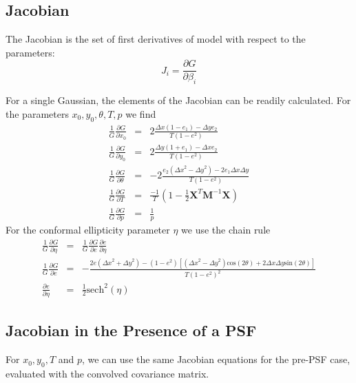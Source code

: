 \documentclass[12pt,preprint]{aastex}
\newcommand{\M}{\textbf{M}}
\newcommand{\X}{\textbf{X}}
\newcommand{\Dx}{\ensuremath{\Delta x}}
\newcommand{\Dy}{\ensuremath{\Delta y}}
\begin{document}
\subsection{Jacobian}

The Jacobian is the set of first derivatives of model with respect
to the parameters:
\begin{equation}
J_i = \frac{\partial G}{\partial \beta_i}
\end{equation}

For a single Gaussian, the elements of the Jacobian can be readily
calculated.  For the parameters $x_0,y_0,\theta,T,p$ we find
\begin{eqnarray}
\frac{1}{G} \frac{\partial G}{\partial x_0}
    & = & 2 \frac{ \Dx (1-e_1) - \Dy e_2 }{T (1-e^2)} \\
\frac{1}{G} \frac{\partial G}{\partial y_0}
    & = & 2 \frac{ \Dy (1+e_1) - \Dx e_2 }{T (1-e^2)} \\
\frac{1}{G} \frac{\partial G}{\partial \theta}
  & = & -2 \frac{ e_2 (\Dx^2-\Dy^2)  - 2 e_1 \Dx \Dy }{T (1-e^2)} \\
\frac{1}{G} \frac{\partial G}{\partial T}
  & = & \frac{-1}{T} \left( 1 - \frac{1}{2} \X^T \M^{-1} \X  \right)  \\
\frac{1}{G} \frac{\partial G}{\partial p}
  & = & \frac{1}{p}
\end{eqnarray}
For the conformal ellipticity parameter $\eta$ we use the chain rule
\begin{eqnarray}
\frac{1}{G} \frac{\partial G}{\partial \eta}
 & = & \frac{1}{G} \frac{\partial G}{\partial e }\frac{\partial e}{\partial \eta} \\
\frac{1}{G} \frac{\partial G}{\partial e } 
  & = & - \frac{ 2 e (\Dx^2 + \Dy^2) - (1-e^2)\left[ (\Dx^2-\Dy^2) \mathrm{cos}(2 \theta) + 2 \Dx \Dy \mathrm{sin}(2 \theta)\right] }{T (1-e^2)^2 } \\
\frac{\partial e}{\partial \eta} & = & \frac{1}{2} \mathrm{sech}^2(\eta)
\end{eqnarray}

\subsection{Jacobian in the Presence of a PSF}

For $x_0,y_0,T$ and $p$, we can use the same Jacobian equations for the pre-PSF
case, evaluated with the convolved covariance matrix. 
\end{document}
